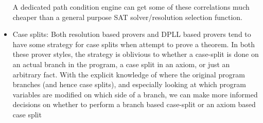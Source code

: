 \begin{itemize}
	 A dedicated path condition engine can get some of these correlations much cheaper than a general purpose SAT solver/resolution selection function.
	\item Case splits: Both resolution based provers and DPLL based provers tend to have some strategy for case splits when attempt to prove a theorem. In both these prover styles, the strategy is oblivious to whether a case-split is done on an actual branch in the program, a case split in an axiom, or just an arbitrary fact.
	With the explicit knowledge of where the original program branches (and hence case splits), and especially looking at which program variables are modified on which side of a branch, we can make more informed decisions on whether to perform a branch based case-split or an axiom based case split
\end{itemize}


